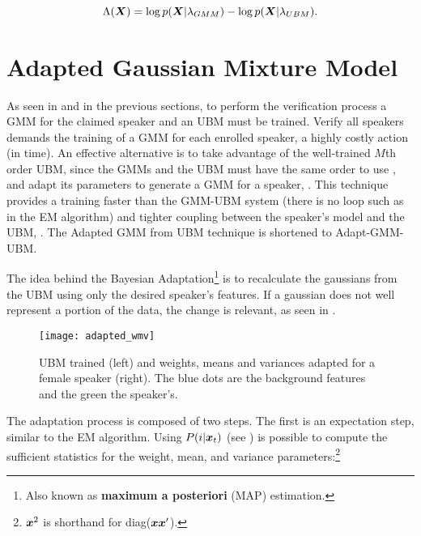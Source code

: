 \begin{equation}
    \Lambda(\dvec{X}) = \log p(\dvec{X}|\lambda_{GMM}) - \log p(\dvec{X}|\lambda_{UBM}).
    \label{eq:score_of_X_gmm_ubm}
\end{equation}

\section{Adapted Gaussian Mixture Model}
\label{sec:adapted-gmm}

As seen in  and in the previous sections, to perform the verification process a GMM for the claimed speaker and an UBM must be trained. Verify all speakers demands the training of a GMM for each enrolled speaker, a highly costly action (in time). An effective alternative is to take advantage of the well-trained $M$th order UBM, since the GMMs and the UBM must have the same order to use , and adapt its parameters to generate a GMM for a speaker, . This technique provides a training faster than the GMM-UBM system (there is no loop such as in the EM algorithm) and tighter coupling between the speaker’s model and the UBM, . The Adapted GMM from UBM technique is shortened to Adapt-GMM-UBM.

The idea behind the Bayesian Adaptation\footnote{Also known as \textbf{maximum a posteriori} (MAP) estimation.} is to recalculate the gaussians from the UBM using only the desired speaker's features. If a gaussian does not well represent a portion of the data, the change is relevant, as seen in .

\begin{figure}[ht]
    \centering
    \texttt{[image: adapted\_wmv]}
    \caption{UBM trained (left) and weights, means and variances adapted for a female speaker (right). The blue dots are the background features and the green the speaker's.}
    \label{fig:adapted_wmv}
\end{figure}

The adaptation process is composed of two steps. The first is an expectation step, similar to the EM algorithm. Using $P(i|\boldsymbol{x}_t)$ (see ) is possible to compute the sufficient statistics for the weight, mean, and variance parameters:\footnote{$\boldsymbol{x}^2$ is shorthand for diag($\boldsymbol{x}\boldsymbol{x}'$).}

